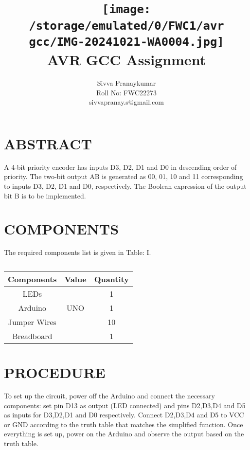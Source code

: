 \documentclass[conference]{IEEEtran}
\title{
\vspace{1cm}
{\texttt{[image: /storage/emulated/0/FWC1/avr gcc/IMG-20241021-WA0004.jpg]} \\ AVR GCC Assignment} }
\author{Sivva Pranaykumar\\ Roll No: FWC22273\\ sivvapranay.s@gmail.com}
\begin{document}
\maketitle
 \section {ABSTRACT}
A 4-bit priority encoder has inputs D3, D2, D1 and D0 in descending order of priority. The two-bit output AB is generated as 00, 01, 10 and 11 corresponding to inputs D3, D2, D1 and D0, respectively. The Boolean expression of the output bit B is to be implemented.
\section{COMPONENTS}
The required components list is given in Table: I. 

 \begin{table} [htbp]
\centering
\begin{tabular}{| c | c | c |} \hline
Components & Value & Quantity \\\hline
LEDs &  & 1 \\ \hline
Arduino & UNO & 1 \\ \hline
Jumper Wires &  & 10 \\ \hline
Breadboard & & 1 \\ 
\hline
\end{tabular}
\vspace{0.1cm}
\caption{\label{tab:widgets}}
\end{table}
\section{PROCEDURE}
To set up the circuit, power off the Arduino and connect the necessary components: set pin D13 as output (LED connected) and pins D2,D3,D4 and D5 as inputs for D3,D2,D1 and D0 respectively. Connect D2,D3,D4 and D5 to VCC or GND according to the truth table that matches the simplified function. Once everything is set up, power on the Arduino and observe the output based on the truth table.
\end{document}

